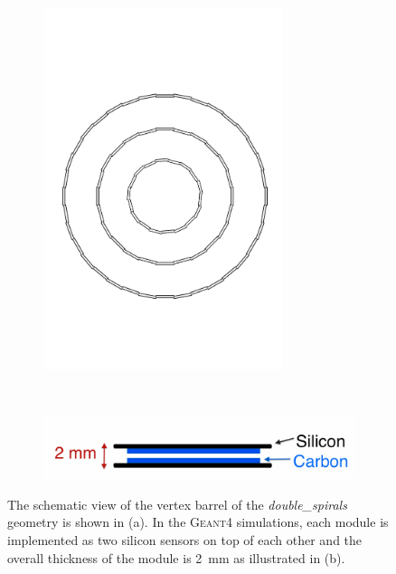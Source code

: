 \vspace{-0.2cm}

\begin{figure}[H]
  \begin{subfigure}[]{0.5\textwidth}
    \centering
    \includegraphics[trim = 0mm 30mm 0mm 30mm, clip, width=7cm]{Figures/Geometries/double_barrel_module.pdf}\caption{}\label{fig:DL_vertex_barrel_a}
  \end{subfigure}~
  \begin{subfigure}[c]{0.5\textwidth}
    \vspace{6.5cm}
    \includegraphics[width=\textwidth]{Figures/Geometries/double_layer_module.png}\caption{}\label{fig:DL_vertex_barrel_b}
  \end{subfigure}
    \caption{The schematic view of the vertex barrel of the {\it double\_spirals} geometry is shown in (a). In the \textsc{Geant4} simulations, each module is implemented as two silicon sensors on top of each other and the overall thickness of the module is \SI{2}{\milli\meter} as illustrated in (b). }\label{fig:DL_vertex_barrel}
\end{figure}

